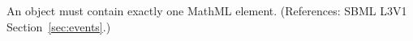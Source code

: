 An \EventAssignment object must contain exactly one MathML 
element.  (References: SBML L3V1 Section~\ref{sec:events}.)
